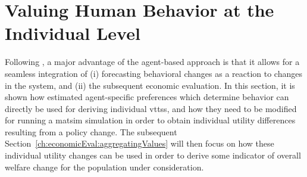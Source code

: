 %
%
%
%
%

\section{Valuing Human Behavior at the Individual Level}
\label{ch:economicEval:valuingBehavior}
Following \citet{deJongEtAl2007LogsumTRA}, a major advantage of the agent-based approach is that it allows for a seamless integration of (i) forecasting behavioral changes as a reaction to changes in the system, and (ii) the subsequent economic evaluation.
%
In this section, it is shown how estimated agent-specific preferences which determine behavior can directly be used for deriving individual \glspl{vtts}, and how they need to be modified for running a \gls{matsim} simulation in order to obtain individual utility differences resulting from a policy change.
%
The subsequent Section~\ref{ch:economicEval:aggregatingValues} will then focus on how these individual utility changes can be used in order to derive some indicator of overall welfare change for the population under consideration.

